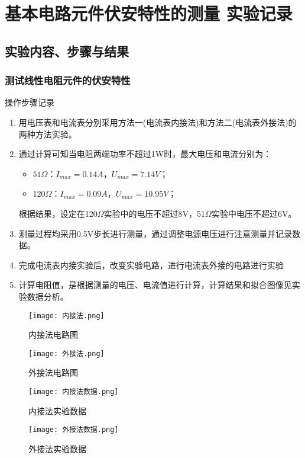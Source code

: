 \documentclass[dvipsnames, svgnames,a4paper,11pt]{article}
\begin{document}
	\section{基本电路元件伏安特性的测量 \quad\heiti 实验记录}
	
	\subsection{实验内容、步骤与结果}
	\subsubsection{测试线性电阻元件的伏安特性}
	操作步骤记录
	\begin{enumerate}
		\item 用电压表和电流表分别采用方法一(电流表内接法)和方法二(电流表外接法)的两种方法实验。
		\item 通过计算可知当电阻两端功率不超过1W时，最大电压和电流分别为：
		\begin{itemize}
			\item $51\Omega$：$I_{max}=0.14A$，$U_{max}=7.14V$；
			\item $120\Omega$：$I_{max}=0.09A$，$U_{max}=10.95V$；
		\end{itemize}
	根据结果，设定在120$\Omega$实验中的电压不超过8V，51$\Omega$实验中电压不超过6V。
	\item 测量过程均采用0.5V步长进行测量，通过调整电源电压进行注意测量并记录数据。
		\item 完成电流表内接实验后，改变实验电路，进行电流表外接的电路进行实验
		\item 计算电阻值，是根据测量的电压、电流值进行计算，计算结果和拟合图像见实验数据分析。
	\end{enumerate}
	
	
	\begin{figure}[H]
		\begin{minipage}[b]{0.4\linewidth}
		  \centering
		  \texttt{[image: 内接法.png]}
		\caption{内接法电路图}
		\end{minipage}
		\hfill
		\begin{minipage}[b]{0.4\linewidth}
		  \centering
		  \texttt{[image: 外接法.png]}
	 	\caption{外接法电路图}
		\end{minipage}
		\hfill
	\end{figure}
	
	\begin{figure}[H]
		\begin{minipage}[b]{0.4\linewidth}
		  \centering
		   \texttt{[image: 内接法数据.png]}
	 	\caption{内接法实验数据}
		\end{minipage}
		\hfill
		\begin{minipage}[b]{0.4\linewidth}
		  \centering
		  \texttt{[image: 外接法数据.png]}
	 	\caption{外接法实验数据}
		\end{minipage}
		\hfill
	\end{figure}
\end{document}
